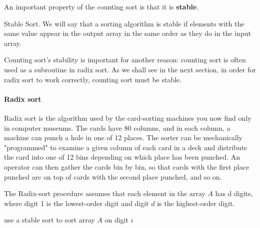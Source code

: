 An important property of the counting sort is that it is \textbf{stable}.

\begin{defbox}{Stable Sort.}
 We will say that a sorting algorithm is stable if elements with the same value appear in the output array in the same order as they do in the input array. \end{defbox}

Counting sort's stability is important for another reason: counting sort is often used as a subroutine in radix sort. As we shall see in the next section, in order for radix sort to work correctly, counting sort must be stable.

\paragraph{Radix sort}
Radix sort is the algorithm used by the card-sorting machines you now find only in computer museums. The cards have 80 columns, and in each column, a machine can punch a hole in one of 12 places. The sorter can be mechanically "programmed" to examine a given column of each card in a deck and distribute the card into one of 12 bins depending on which place has been punched. An operator can then gather the cards bin by bin, so that cards with the first place punched are on top of cards with the second place punched, and so on.

The Radix-sort procedure assumes that each element in the array $A$ has d digits, where digit 1 is the lowest-order digit and digit $d$ is the highest-order digit.


  \begin{algorithm}
     {
        use a stable sort to sort array $A$ on digit $i$
    }
  \end{algorithm}

